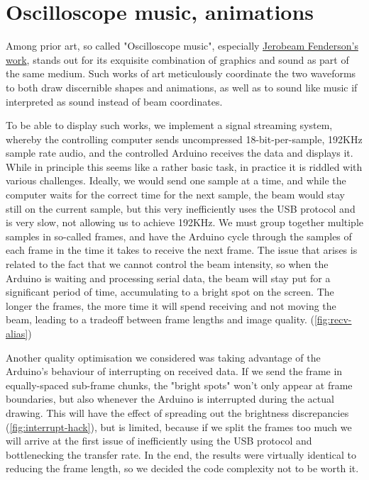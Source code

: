 \documentclass[12pt]{article}
\begin{document}
\section{Oscilloscope music, animations}

Among prior art, so called "Oscilloscope music", especially \href{https://www.youtube.com/playlist?list=PLFgoUhNvMLrr8izq38HX6rjFR-nkfklxw}{Jerobeam Fenderson's work}, stands out for its exquisite combination of graphics and sound as part of the same medium. Such works of art meticulously coordinate the two waveforms to both draw discernible shapes and animations, as well as to sound like music if interpreted as sound instead of beam coordinates.

To be able to display such works, we implement a signal streaming system, whereby the controlling computer sends uncompressed 18-bit-per-sample, 192KHz sample rate audio, and the controlled Arduino receives the data and displays it. While in principle this seems like a rather basic task, in practice it is riddled with various challenges. Ideally, we would send one sample at a time, and while the computer waits for the correct time for the next sample, the beam would stay still on the current sample, but this very inefficiently uses the USB protocol and is very slow, not allowing us to achieve 192KHz. We must group together multiple samples in so-called frames, and have the Arduino cycle through the samples of each frame in the time it takes to receive the next frame. The issue that arises is related to the fact that we cannot control the beam intensity, so when the Arduino is waiting and processing serial data, the beam will stay put for a significant period of time, accumulating to a bright spot on the screen. The longer the frames, the more time it will spend receiving and not moving the beam, leading to a tradeoff between frame lengths and image quality. (\autoref{fig:recv-alias})

Another quality optimisation we considered was taking advantage of the Arduino's behaviour of interrupting on received data. If we send the frame in equally-spaced sub-frame chunks, the "bright spots" won't only appear at frame boundaries, but also whenever the Arduino is interrupted during the actual drawing. This will have the effect of spreading out the brightness discrepancies (\autoref{fig:interrupt-hack}), but is limited, because if we split the frames too much we will arrive at the first issue of inefficiently using the USB protocol and bottlenecking the transfer rate. In the end, the results were virtually identical to reducing the frame length, so we decided the code complexity not to be worth it.
\end{document}
